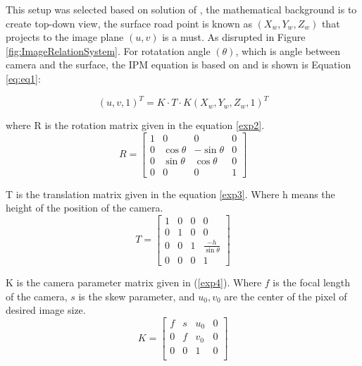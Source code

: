 This setup was selected based on solution of \cite{Wongsaree2018}, the mathematical background is to create top-down view, the surface road point is known as $(X_w,Y_w,Z_w)$
that projects to the image plane $(u,v)$ is a must. As disrupted in Figure \ref{fig:ImageRelationSystem}. For rotatation angle $(\theta)$, which is angle between camera and the surface, the IPM equation is based on \cite{7759904} and is shown is Equation \ref{eq:eq1}:

\begin{equation}
    (u,v,1)^T = K\cdot T \cdot K (X_w,Y_w, Z_w,1)^T
    \label{eq:eq1}
\end{equation}

where R is the rotation matrix given in the equation \ref{exp2}.
\begin{equation} \label{exp2}
R=
\begin{bmatrix}
1 & 0 & 0 & 0\\
0 & \cos{\theta} & -\sin{\theta} & 0\\
0 & \sin{\theta} & \cos{\theta} & 0\\
0 & 0 & 0 & 1
\end{bmatrix}
\end{equation}
\par

T is the translation matrix given in the equation \ref{exp3}. Where h means the height of the position of the camera.
\begin{equation} \label{exp3}
T=
\begin{bmatrix}
1 & 0 & 0 & 0\\
0 & 1 & 0 & 0\\
0 & 0 & 1 & \frac{-h}{\sin{\theta}}\\
0 & 0 & 0 & 1
\end{bmatrix}
\end{equation}


\par
K is the camera parameter matrix given in (\ref{exp4}). Where $f$ is the focal length of the camera, $s$ is the skew parameter, and $u_0, v_0$ are the center of the pixel of desired image size. 
\begin{equation} \label{exp4}
K =
\begin{bmatrix}
f & s & u_0 & 0\\
0 & f & v_0 & 0\\
0 & 0 & 1 & 0\\
\end{bmatrix}
\end{equation}

